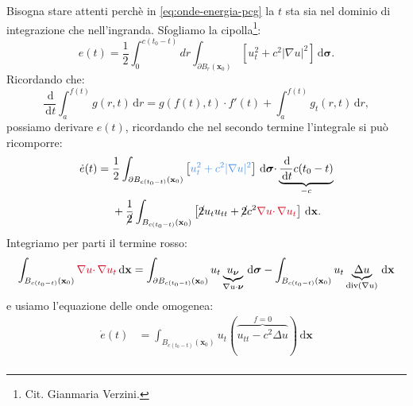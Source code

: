 \documentclass[10pt,a4paper,twoside,openright]{book}
\newcommand{\x}{\mathbf{x}}
\newcommand{\sigg}{\bm{\sigma}}
\newcommand{\de}{\,\mathrm d}
\newcommand{\dr}{\de r}
\newcommand{\dt}{\de t}
\newcommand{\dxx}{\de \x}
\newcommand{\dsig}{\de \sigg}
\begin{document}
\begin{dimostrazione}
	Bisogna stare attenti perchè in \eqref{eq:onde-energia-pcg} la $t$ sta sia nel dominio di integrazione che nell'ingranda. Sfogliamo la cipolla\footnote{Cit. Gianmaria Verzini.}:
	\begin{equation*}
		e(t) =\frac{1}{2}\int _{0}^{c(t_{0} -t)} dr\int _{\partial B_{r}(\x_{0})}\left[ u_{t}^{2} +c^{2}| \nabla u| ^{2}\right] \dsig .
	\end{equation*}
	Ricordando che:
	\begin{equation*}
		\frac{\de}{\dt}\int _{a}^{f(t)} g(r,t) \dr=g(f(t),t) \cdotp f'(t) +\int _{a}^{f(t)} g_{t}(r,t) \dr,
	\end{equation*}
	possiamo derivare $e(t)$, ricordando che nel secondo termine l'integrale si può ricomporre:
	\begin{align*}
		\dot{e}(t) & =\frac{1}{2}\int _{\partial B_{c(t_{0} -t)}(\x_{0})}\left[\textcolor[rgb]{0.29,0.56,0.89}{u_{t}^{2}+c^{2}| \nabla u| ^{2}}\right] \dsig \cdotp \underbrace{\frac{\de}{\dt} c(t_{0} -t)}_{-c} \\
		            & \ \ \ \ +\frac{1}{\cancel{2}}\int _{B_{c(t_{0} -t)}(\x_{0})}\left[\cancel{2} u_{t} u_{tt} +\cancel{2} c^{2}\textcolor[rgb]{0.82,0.01,0.11}{\nabla u\cdotp \nabla u_{t}}\right] \dxx.                                                                                                                                                                                                 
	\end{align*}
	Integriamo per parti il termine rosso:
	\begin{equation*}
		\int _{B_{c(t_{0} -t)}(\x_{0})}\textcolor[rgb]{0.82,0.01,0.11}{\nabla u\cdotp \nabla u_{t}} \dxx =\int _{\partial B_{c(t_{0} -t)}(\x_{0})} u_{t}\underbrace{u_{\bm{\nu }}}_{\nabla u\cdotp \bm{\nu }} \dsig -\int _{B_{c(t_{0} -t)}(\x_{0})} u_{t}\underbrace{\Delta u}_{\mathrm{div}(\nabla u)} \dxx
	\end{equation*}
	e usiamo l'equazione delle onde omogenea:
	\begin{align*}
		\dot{e}(t) & =\int _{B_{c(t_{0} -t)}(\x_{0})} u_{t}(\overbrace{u_{tt} -c^{2} \Delta u}^{f=0}) \dxx                                                                                                                                                                                                                                                                                                                                                                                       \\

\end{align*}
\end{dimostrazione}
\end{document}
